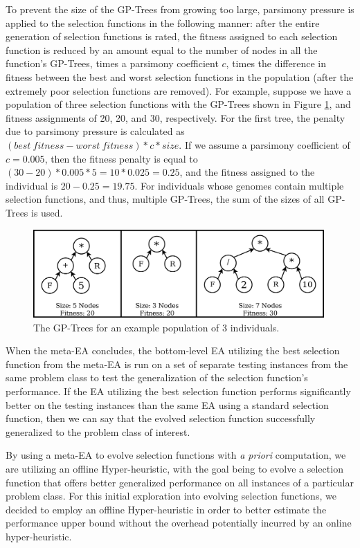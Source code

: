 \documentclass[times,12pt,titlepage]{mstogs}
\begin{document}
\begin{ThesisBody}
To prevent the size of the GP-Trees from growing too large, parsimony pressure is applied to the selection functions in the following manner: after the entire generation of selection functions is rated, the fitness assigned to each selection function is reduced by an amount equal to the number of nodes in all the function's GP-Trees, times a parsimony coefficient $c$, times the difference in fitness between the best and worst selection functions in the population (after the extremely poor selection functions are removed). For example, suppose we have a population of three selection functions with the GP-Trees shown in Figure \ref{fig:parsimony_example}, and fitness assignments of 20, 20, and 30, respectively. For the first tree, the penalty due to parsimony pressure is calculated as $(best\ fitness - worst\ fitness) * c * size$. If we assume a parsimony coefficient of $c = 0.005$, then the fitness penalty is equal to $(30 - 20) * 0.005 * 5 = 10 * 0.025 = 0.25$, and the fitness assigned to the individual is $20 - 0.25 = 19.75$. For individuals whose genomes contain multiple selection functions, and thus, multiple GP-Trees, the sum of the sizes of all GP-Trees is used.

\begin{figure}
	\centering
	\includegraphics[width=0.99\textwidth]{parsimony_example}
	\caption{The GP-Trees for an example population of 3 individuals.}
	\label{fig:parsimony_example}
\end{figure}

When the meta-EA concludes, the bottom-level EA utilizing the best selection function from the meta-EA is run on a set of separate testing instances from the same problem class to test the generalization of the selection function's performance. If the EA utilizing the best selection function performs significantly better on the testing instances than the same EA using a standard selection function, then we can say that the evolved selection function successfully generalized to the problem class of interest. 

By using a meta-EA to evolve selection functions with \textit{a priori} computation, we are utilizing an offline Hyper-heuristic, with the goal being to evolve a selection function that offers better generalized performance on all instances of a particular problem class. For this initial exploration into evolving selection functions, we decided to employ an offline Hyper-heuristic in order to better estimate the performance upper bound without the overhead potentially incurred by an online hyper-heuristic.


\end{ThesisBody}
\end{document}
